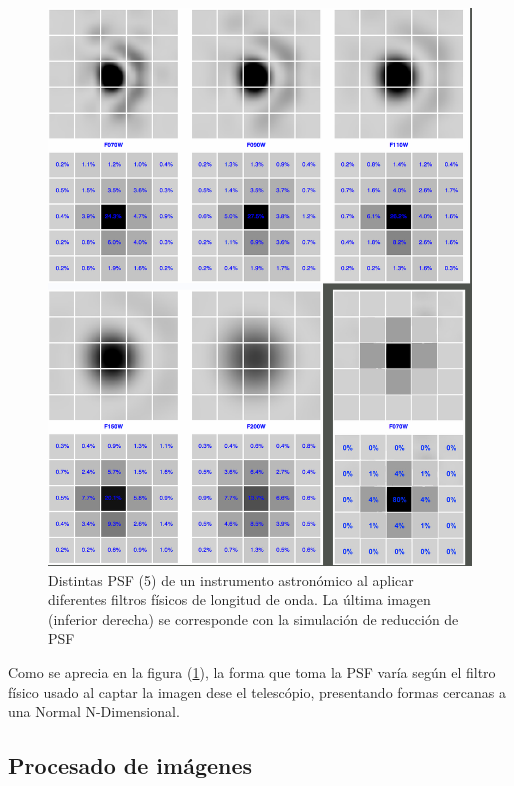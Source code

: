 \begin{enumerate}
\begin{figure}[!htb]
    		\includegraphics[width=1\textwidth]{images/PSFUnificadas.png}
    		\caption{\label{fig:psfInfrared}{\small Distintas PSF (5) de un instrumento astronómico al aplicar diferentes filtros físicos de longitud de onda. La última imagen (inferior derecha) se corresponde con la simulación de reducción de PSF}}
    	\end{figure}
	Como se aprecia en la figura (\ref{fig:psfInfrared}), la forma que toma la PSF varía según el filtro físico usado al captar la imagen dese el telescópio, presentando formas cercanas a una Normal N-Dimensional.

	\end{enumerate}
	\clearpage
	\subsection{Procesado de imágenes}

